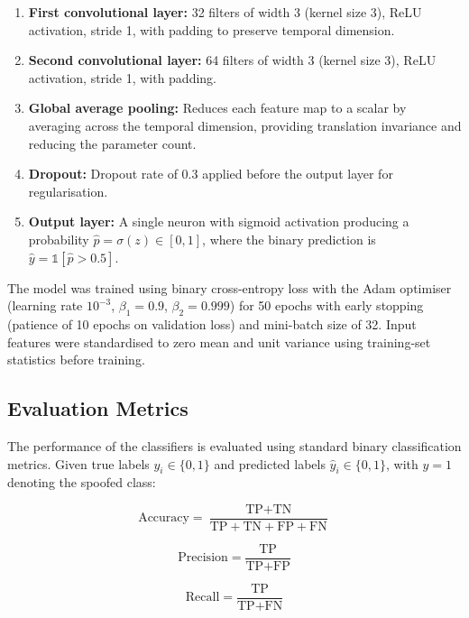 \documentclass[electronics,article,accept,moreauthors]{Definitions/mdpi}
\begin{document}
\begin{enumerate}
\item \textbf{First convolutional layer:} 32 filters of width 3 (kernel size 3), ReLU activation, stride 1, with padding to preserve temporal dimension.
\item \textbf{Second convolutional layer:} 64 filters of width 3 (kernel size 3), ReLU activation, stride 1, with padding.
\item \textbf{Global average pooling:} Reduces each feature map to a scalar by averaging across the temporal dimension, providing translation invariance and reducing the parameter count.
\item \textbf{Dropout:} Dropout rate of 0.3 applied before the output layer for regularisation.
\item \textbf{Output layer:} A single neuron with sigmoid activation producing a probability $\hat{p} = \sigma(z) \in [0, 1]$, where the binary prediction is $\hat{y} = \mathbb{1}[\hat{p} > 0.5]$.
\end{enumerate}

The model was trained using binary cross-entropy loss with the Adam optimiser (learning rate $10^{-3}$, $\beta_1 = 0.9$, $\beta_2 = 0.999$) for 50 epochs with early stopping (patience of 10 epochs on validation loss) and mini-batch size of 32. Input features were standardised to zero mean and unit variance using training-set statistics before training.

\subsection{Evaluation Metrics}
\label{sec:evaluation}

The performance of the classifiers is evaluated using standard binary classification metrics. Given true labels $y_i \in \{0, 1\}$ and predicted labels $\hat{y}_i \in \{0, 1\}$, with $y = 1$ denoting the spoofed class:

\begin{equation}
\text{Accuracy} = \frac{\text{TP} + \text{TN}}{\text{TP} + \text{TN} + \text{FP} + \text{FN}}
\label{eq:accuracy}
\end{equation}

\begin{equation}
\text{Precision} = \frac{\text{TP}}{\text{TP} + \text{FP}}
\label{eq:precision}
\end{equation}

\begin{equation}
\text{Recall} = \frac{\text{TP}}{\text{TP} + \text{FN}}
\label{eq:recall}
\end{equation}
\end{document}

